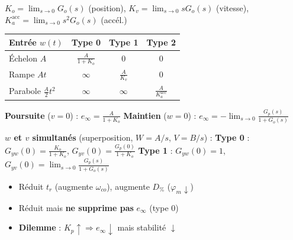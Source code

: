 \begin{tcolorbox}[colback=ch6teal!5,colframe=ch6teal!80!black,title={Erreur permanente : constantes, tableau \& perturbation}]
$K_o = \lim_{s\to 0} G_o(s)$ (position), $K_v = \lim_{s\to 0} sG_o(s)$ (vitesse), $K_a^{\text{acc}} = \lim_{s\to 0} s^2 G_o(s)$ (acc\'el.)
\begin{center}
\renewcommand{\arraystretch}{1.1}
\scriptsize
\begin{tabular}{@{}lccc@{}}
\toprule
Entr\'ee $w(t)$ & Type 0 & Type 1 & Type 2 \\
\midrule
\'Echelon $A$ & $\frac{A}{1{+}K_o}$ & $0$ & $0$ \\[3pt]
Rampe $At$ & $\infty$ & $\frac{A}{K_v}$ & $0$ \\[3pt]
Parabole $\frac{A}{2}t^2$ & $\infty$ & $\infty$ & $\frac{A}{K_a^{\text{acc}}}$ \\
\bottomrule
\end{tabular}
\end{center}
\textbf{Poursuite} ($v{=}0$) : $e_\infty = \frac{A}{1{+}K_o}$ \quad
\textbf{Maintien} ($w{=}0$) : $e_\infty = -\lim_{s\to 0} \frac{G_p(s)}{1{+}G_o(s)}$
\par\smallskip
\textbf{$w$ et $v$ simultan\'es} (superposition, $W{=}A/s$, $V{=}B/s$) :
\textbf{Type 0} : $G_{yw}(0){=}\frac{K_o}{1{+}K_o}$, $G_{yv}(0){=}\frac{G_p(0)}{1{+}K_o}$ \quad
\textbf{Type 1} : $G_{yw}(0){=}1$, $G_{yv}(0){=}\lim_{s\to 0}\frac{G_p(s)}{1{+}G_o(s)}$
\end{tcolorbox}

\begin{tcolorbox}[colback=ch6teal!5,colframe=ch6teal!80!black,title={R\'egulateur P (Proportionnel)}]
\begin{itemize}
  \item R\'eduit $t_r$ (augmente $\omega_{co}$), augmente $D_\%$ ($\varphi_m \downarrow$)
  \item R\'eduit mais \textbf{ne supprime pas} $e_\infty$ (type 0)
  \item \textbf{Dilemme} : $K_p \uparrow \Rightarrow e_\infty \downarrow$ mais stabilit\'e $\downarrow$
\end{itemize}
\end{tcolorbox}

